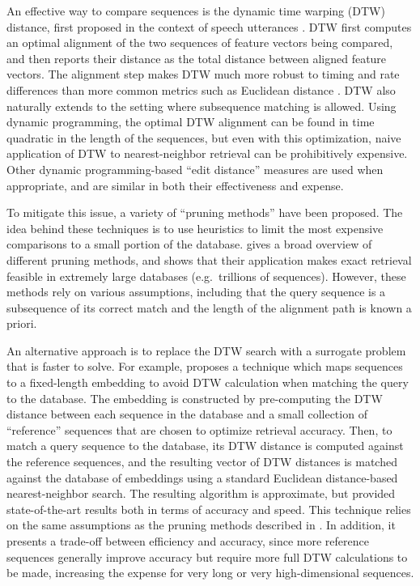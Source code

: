 \documentclass{article}
\begin{document}
An effective way to compare sequences is the dynamic time warping (DTW) distance, first proposed in the context of speech utterances \cite{sakoe1978dynamic}.
DTW first computes an optimal alignment of the two sequences of feature vectors being compared, and then reports their distance as the total distance between aligned feature vectors.
The alignment step makes DTW much more robust to timing and rate differences than more common metrics such as Euclidean distance \cite{rakthanmanon2012searching}.
DTW also naturally extends to the setting where subsequence matching is allowed.
Using dynamic programming, the optimal DTW alignment can be found in time quadratic in the length of the sequences, but even with this optimization, naive application of DTW to nearest-neighbor retrieval  can be prohibitively expensive.
Other dynamic programming-based ``edit distance'' measures are used when appropriate, and are similar in both their effectiveness and expense.

To mitigate this issue, a variety of ``pruning methods'' have been proposed.
The idea behind these techniques is to use heuristics to limit the most expensive comparisons to 
a small portion of the database.
\cite{rakthanmanon2012searching} gives a broad overview of different pruning methods, and shows that their application makes exact retrieval feasible in extremely large databases (e.g.\ trillions of sequences).
However, these methods rely on various assumptions, including that the query sequence is a subsequence of its correct match and the length of the alignment path is known a priori.

An alternative approach is to replace the DTW search with a surrogate problem that is faster to solve.
For example, \cite{papapetrou2011embedding} proposes a technique which maps sequences to a fixed-length embedding to avoid DTW calculation when matching the query to the database.
The embedding is constructed by pre-computing the DTW distance between each sequence in the database and a small collection of ``reference'' sequences that are chosen to optimize retrieval accuracy.
Then, to match a query sequence to the database, its DTW distance is computed against the reference sequences, and the resulting vector of DTW distances is matched against the database of embeddings using a standard Euclidean distance-based nearest-neighbor search.
The resulting algorithm is approximate, but provided state-of-the-art results both in terms of accuracy and speed.
This technique relies on the same assumptions as the pruning methods described in \cite{rakthanmanon2012searching}.
In addition, it presents a trade-off between efficiency and accuracy, since more reference sequences generally improve accuracy but require more full DTW calculations to be made, increasing the expense for very long or very high-dimensional sequences.
\end{document}
